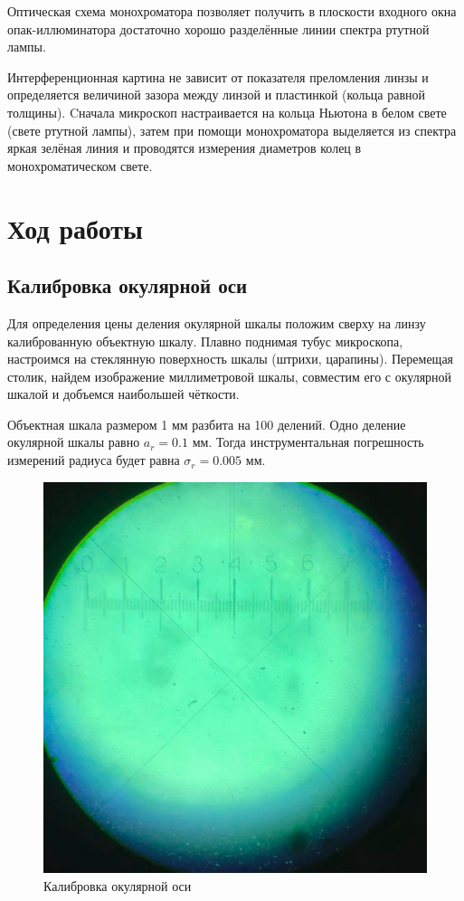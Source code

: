 Оптическая схема монохроматора позволяет получить в плоскости входного окна опак-иллюминатора достаточно хорошо разделённые линии спектра ртутной лампы.

Интерференционная картина не зависит от показателя преломления линзы и определяется величиной зазора между линзой и пластинкой (кольца равной толщины).
Cначала микроскоп настраивается на кольца Ньютона в белом свете (свете ртутной лампы), затем при помощи монохроматора выделяется из спектра яркая зелёная линия и проводятся измерения диаметров колец в монохроматическом свете.

\section*{Ход работы}

\subsection*{Калибровка окулярной оси}

Для определения цены деления окулярной шкалы положим сверху на линзу калиброванную объектную шкалу. Плавно поднимая тубус микроскопа, настроимся на стеклянную поверхность шкалы (штрихи, царапины). Перемещая столик, найдем изображение миллиметровой шкалы, совместим его с окулярной шкалой и добъемся наибольшей чёткости.

Объектная шкала размером 1 мм разбита на 100 делений. Одно деление окулярной шкалы равно $a_r = 0.1$ мм. Тогда инструментальная погрешность измерений радиуса будет равна $\sigma_r = 0.005$ мм.

\begin{figure}[h!]
    \centering
    \includegraphics[width=12cm]{images/shkala.jpg}
    \caption{Калибровка окулярной оси}
\end{figure}

